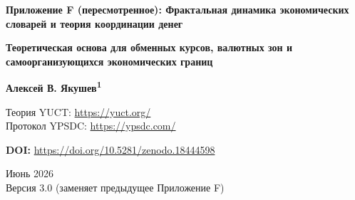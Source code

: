 \documentclass[12pt,a4paper]{article}
\theoremstyle{remark}
\begin{document}
	
	\begin{titlepage}
		\centering
		\vspace*{1cm}
		
		\Huge\textbf{Приложение F (пересмотренное): Фрактальная динамика экономических словарей и теория координации денег}
		
		\vspace{0.5cm}
		\Large\textbf{Теоретическая основа для обменных курсов, валютных зон и самоорганизующихся экономических границ}
		
		\vspace{1.5cm}
		
		\Large\textbf{Алексей В. Якушев\textsuperscript{1}}
		
		Теория YUCT: \url{https://yuct.org/}\\
		Протокол YPSDC: \url{https://ypsdc.com/}
		
		\vspace{2cm}
		\textbf{DOI:} \url{https://doi.org/10.5281/zenodo.18444598}
		
		\vspace{1cm}
		
		\large
		Июнь 2026 \\ \large Версия 3.0 (заменяет предыдущее Приложение F)
		
		\vspace{2cm}
		

\end{titlepage}
\end{document}
